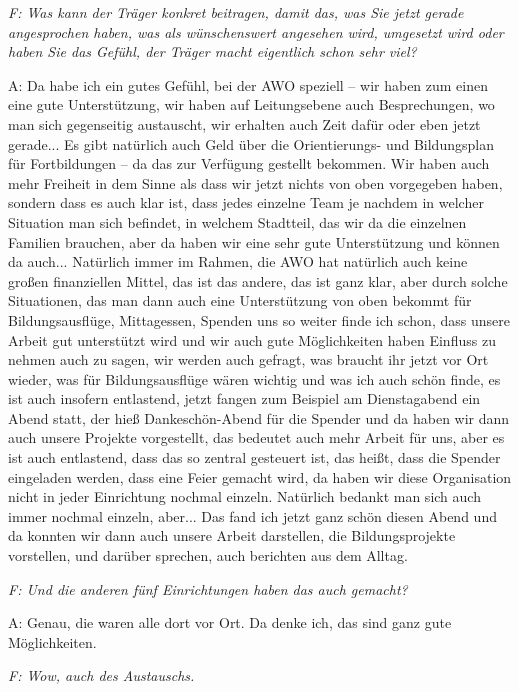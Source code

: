 \emph{F: Was kann der Träger konkret beitragen, damit das, was Sie jetzt gerade angesprochen haben, was als wünschenswert angesehen wird, umgesetzt wird oder haben Sie das Gefühl, der Träger macht eigentlich schon sehr viel?}

A: Da habe ich ein gutes Gefühl, bei der AWO speziell -- wir haben zum einen eine gute Unterstützung, wir haben auf Leitungsebene auch Besprechungen, wo man sich gegenseitig austauscht, wir erhalten auch Zeit dafür oder eben jetzt gerade... Es gibt natürlich auch Geld über die Orientierungs- und Bildungsplan für Fortbildungen -- da das zur Verfügung gestellt bekommen. Wir haben auch mehr Freiheit in dem Sinne als dass wir jetzt nichts von oben vorgegeben haben, sondern dass es auch klar ist, dass jedes einzelne Team je nachdem in welcher Situation man sich befindet, in welchem Stadtteil, das wir da die einzelnen Familien brauchen, aber da haben wir eine sehr gute Unterstützung und können da auch... Natürlich immer im Rahmen, die AWO hat natürlich auch keine großen finanziellen Mittel, das ist das andere, das ist ganz klar, aber durch solche Situationen, das man dann auch eine Unterstützung von oben bekommt für Bildungsausflüge, Mittagessen, Spenden uns so weiter finde ich schon, dass unsere Arbeit gut unterstützt wird und wir auch gute Möglichkeiten haben Einfluss zu nehmen auch zu sagen, wir werden auch gefragt, was braucht ihr jetzt vor Ort wieder, was für Bildungsausflüge wären wichtig und was ich auch schön finde, es ist auch insofern entlastend, jetzt fangen zum Beispiel am Dienstagabend ein Abend statt, der hieß Dankeschön-Abend für die Spender und da haben wir dann auch unsere Projekte vorgestellt, das bedeutet auch mehr Arbeit für uns, aber es ist auch entlastend, dass das so zentral gesteuert ist, das heißt, dass die Spender eingeladen werden, dass eine Feier gemacht wird, da haben wir diese Organisation nicht in jeder Einrichtung nochmal einzeln. Natürlich bedankt man sich auch immer nochmal einzeln, aber... Das fand ich jetzt ganz schön diesen Abend und da konnten wir dann auch unsere Arbeit darstellen, die Bildungsprojekte vorstellen, und darüber sprechen, auch berichten aus dem Alltag.

\emph{F: Und die anderen fünf Einrichtungen haben das auch gemacht?}

A: Genau, die waren alle dort vor Ort. Da denke ich, das sind ganz gute Möglichkeiten.

\emph{F: Wow, auch des Austauschs.}

